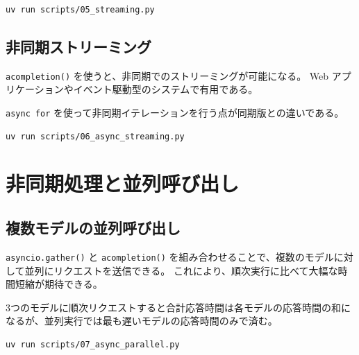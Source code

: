 \documentclass[a4paper,11pt]{ltjsarticle}
\newcommand{\code}[1]{\texttt{#1}}
\begin{document}
\begin{lstlisting}[style=bash]
uv run scripts/05_streaming.py
\end{lstlisting}

\subsection{非同期ストリーミング}
\label{subsec:async_stream}

\code{acompletion()} を使うと、非同期でのストリーミングが可能になる。
Web アプリケーションやイベント駆動型のシステムで有用である。



\code{async for} を使って非同期イテレーションを行う点が同期版との違いである。

\begin{lstlisting}[style=bash]
uv run scripts/06_async_streaming.py
\end{lstlisting}


\section{非同期処理と並列呼び出し}
\label{sec:async}

\subsection{複数モデルの並列呼び出し}
\label{subsec:parallel}

\code{asyncio.gather()} と \code{acompletion()} を組み合わせることで、複数のモデルに対して並列にリクエストを送信できる。
これにより、順次実行に比べて大幅な時間短縮が期待できる。



\begin{tipbox}[ポイント]
3つのモデルに順次リクエストすると合計応答時間は各モデルの応答時間の和になるが、並列実行では最も遅いモデルの応答時間のみで済む。
\end{tipbox}

\begin{lstlisting}[style=bash]
uv run scripts/07_async_parallel.py
\end{lstlisting}
\end{document}
